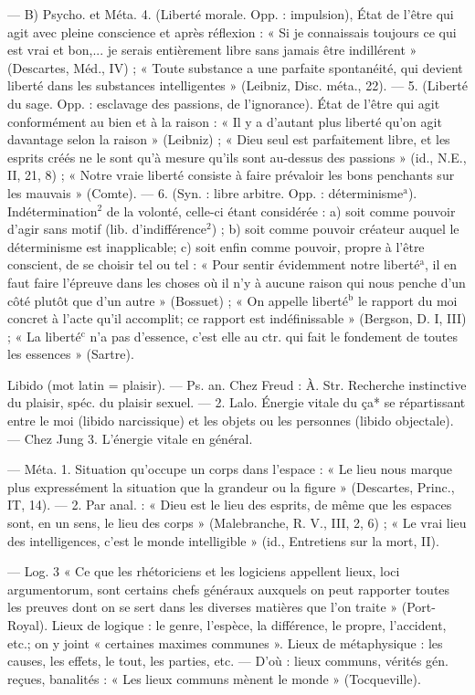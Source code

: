 \begin{itemize}[leftmargin=1cm, label=, itemsep=1pt]
— B) Psycho. et Méta. 4. (Liberté
morale. Opp. : impulsion), État de
l'être qui agit avec pleine conscience
et après réflexion : « Si je connaissais toujours ce qui est vrai et bon,...
je serais entièrement libre sans
jamais être indillérent » (Descartes,
Méd., IV) ; « Toute substance a une
parfaite spontanéité, qui devient
liberté dans les substances intelligentes » (Leibniz, Disc. méta., 22). —
5. (Liberté du sage. Opp. : esclavage
des passions, de l'ignorance). État
de l'être qui agit conformément au
bien et à la raison : « Il y a d’autant
plus liberté qu’on agit davantage
selon la raison » (Leibniz) ; « Dieu
seul est parfaitement libre, et les
esprits créés ne le sont qu’à mesure
qu'ils sont au-dessus des passions »
(id., N.E., II, 21, 8) ; « Notre vraie
liberté consiste à faire prévaloir
les bons penchants sur les mauvais »
(Comte). — 6. (Syn. : libre arbitre.
Opp. : déterminisme$^\text{a}$). Indétermination$^2$ de la volonté, celle-ci étant
considérée : a) soit comme pouvoir
d’agir sans motif (lib. d’indifférence$^2$) ;
b) soit comme pouvoir créateur
auquel le déterminisme est inapplicable; c) soit enfin comme pouvoir, propre à l'être conscient, de
se choisir tel ou tel : « Pour sentir
évidemment notre liberté$^\text{a}$, il en
faut faire l'épreuve dans les choses
où il n’y à aucune raison qui nous
penche d’un côté plutôt que d’un
autre » (Bossuet) ; « On appelle liberté$^\text{b}$ le rapport du moi concret à
l'acte qu'il accomplit; ce rapport
est indéfinissable » (Bergson, D. I,
III) ; « La liberté$^\text{c}$ n’a pas d'essence,
c’est elle au ctr. qui fait le fondement de toutes les essences » (Sartre).

Libido (mot latin = plaisir). — Ps.
an. Chez Freud : À. Str. Recherche
instinctive du plaisir, spéc. du plaisir
sexuel. — 2. Lalo. Énergie vitale
du ça* se répartissant entre le moi
(libido narcissique) et les objets ou
les personnes (libido objectale). —
Chez Jung 3. L'énergie vitale
en général.

 — Méta. 1. Situation qu’occupe
un corps dans l’espace : « Le lieu
nous marque plus expressément la
situation que la grandeur ou la
figure » (Descartes, Princ., IT, 14).
— 2. Par anal. : « Dieu est le lieu
des esprits, de même que les espaces
sont, en un sens, le lieu des corps »
(Malebranche, R. V., III, 2, 6) ; « Le
vrai lieu des intelligences, c’est le
monde intelligible » (id., Entretiens
sur la mort, II).

— Log. 3 « Ce que les rhétoriciens et les logiciens appellent lieux,
loci argumentorum, sont certains
chefs généraux auxquels on peut
rapporter toutes les preuves dont
on se sert dans les diverses matières
que l’on traite » (Port-Royal). Lieux
de logique : le genre, l’espèce, la différence, le propre, l'accident, etc.; on
y joint « certaines maximes communes ». Lieux de métaphysique : les
causes, les effets, le tout, les parties, etc. — D'où : lieux communs,
vérités gén. reçues, banalités : « Les
lieux communs mènent le monde »
(Tocqueville).


\end{itemize}
